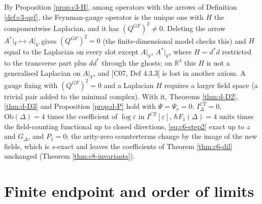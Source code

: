 \begin{remark}[Gauge fixing with $(Q^{GF})^2=0$]
\label{rem:d-gf}
By Proposition \ref{prop:c3-H}, among operators with the arrows of Definition \ref{def:c3-qgf}, the Feynman-gauge operator is the unique one with $H$ the componentwise Laplacian, and it has $(Q^{GF})^2\neq0$. Deleting the arrow $A^*|_V\mapsto A|_V$ gives $(Q^{GF})^2=0$ (the finite-dimensional model checks this) and $H$ equal to the Laplacian on every slot except $A|_V$, $A^*|_V$, where $H=d^*d$ restricted to the transverse part plus $dd^*$ through the ghosts; on $\mathbb R^4$ this $H$ is not a generalised Laplacian on $A|_V$, and [C07, Def 4.3.3] is lost in another axiom. A gauge fixing with $(Q^{GF})^2=0$ and a Laplacian $H$ requires a larger field space (a trivial pair added to the minimal complex). With it, Theorems \ref{thm:d-D2}, \ref{thm:d-D3} and Proposition \ref{prop:d-P} hold with $\Psi=\Psi_v=0$: $I^{CT}_\Delta=0$, $\mathrm{Ob}(\Delta)=4$ times the coefficient of $\log\varepsilon$ in $I^{CT}[\varepsilon]$, $\hbar F_1(\Delta)=4$ units times the field-counting functional up to closed directions, \eqref{eq:c6-step2} exact up to $z$ and $G_\Delta$, and $P_1=0$; the arity-zero counterterms change by the image of the new fields, which is $s$-exact and leaves the coefficients of Theorem \ref{thm:c6-dil} unchanged (Theorem \ref{thm:c8-invariants}).
\end{remark}

\section{Finite endpoint and order of limits}

